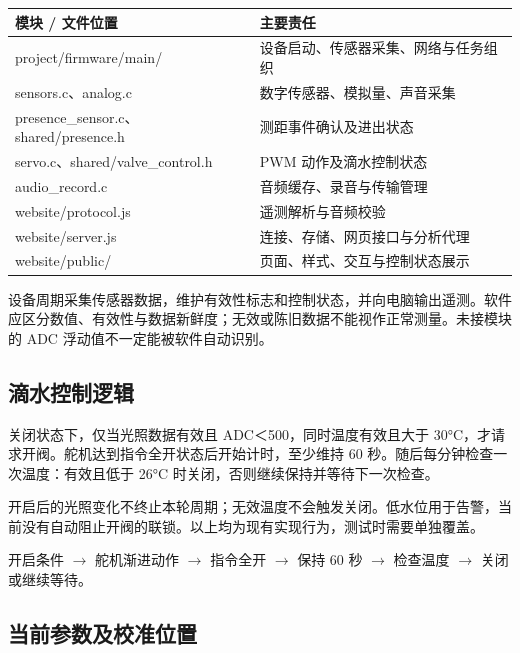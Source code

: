 \documentclass[10pt,a4paper]{article}
\begin{document}
\begin{longtable}{p{54mm}p{111mm}}
\toprule
\textbf{模块 / 文件位置} & \textbf{主要责任}\\\midrule\endhead
project/firmware/main/ & 设备启动、传感器采集、网络与任务组织\\
sensors.c、analog.c & 数字传感器、模拟量、声音采集\\
presence\_sensor.c、shared/presence.h & 测距事件确认及进出状态\\
servo.c、shared/valve\_control.h & PWM 动作及滴水控制状态\\
audio\_record.c & 音频缓存、录音与传输管理\\
website/protocol.js & 遥测解析与音频校验\\
website/server.js & 连接、存储、网页接口与分析代理\\
website/public/ & 页面、样式、交互与控制状态展示\\
\bottomrule\end{longtable}

设备周期采集传感器数据，维护有效性标志和控制状态，并向电脑输出遥测。软件应区分数值、有效性与数据新鲜度；无效或陈旧数据不能视作正常测量。未接模块的 ADC 浮动值不一定能被软件自动识别。


\subsection{滴水控制逻辑}

关闭状态下，仅当光照数据有效且 ADC＜500，同时温度有效且大于 30°C，才请求开阀。舵机达到指令全开状态后开始计时，至少维持 60 秒。随后每分钟检查一次温度：有效且低于 26°C 时关闭，否则继续保持并等待下一次检查。


开启后的光照变化不终止本轮周期；无效温度不会触发关闭。低水位用于告警，当前没有自动阻止开阀的联锁。以上均为现有实现行为，测试时需要单独覆盖。


开启条件 $\rightarrow$ 舵机渐进动作 $\rightarrow$ 指令全开 $\rightarrow$ 保持 60 秒 $\rightarrow$ 检查温度 $\rightarrow$ 关闭或继续等待。


\clearpage

\subsection{当前参数及校准位置}
\end{document}
